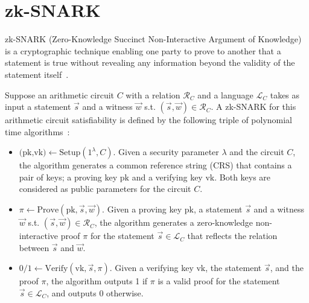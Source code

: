 \documentclass{article}
\begin{document}
\section{zk-SNARK}
zk-SNARK (Zero-Knowledge Succinct Non-Interactive Argument of Knowledge) is a cryptographic technique enabling one party to prove to another that a statement is true without revealing any information beyond the validity of the statement itself~\cite{grothSizePairingbasedNoninteractive2016}.

Suppose an arithmetic circuit $C$ with a relation $\mathcal{R}_C$ and a language $\mathcal{L}_C$ takes as input a statement $\vec{s}$ and a witness $\vec{w}$ s.t. $(\vec{s}, \vec{w}) \in \mathcal{R}_C$. A zk-SNARK for this arithmetic circuit satisfiability is defined by the following triple of polynomial time algorithms~\cite{grothSizePairingbasedNoninteractive2016,parnoPinocchioNearlyPractical2013}:
\begin{itemize}
    \item $\textrm{(pk,vk)} \gets \textrm{Setup}(1^\lambda,C)$. Given a security parameter $\lambda$ and the circuit $C$, the algorithm generates a common reference string (CRS) that contains a pair of keys; a proving key $\textrm{pk}$ and a verifying key $\textrm{vk}$. Both keys are considered as public parameters for the circuit $C$.
    \item $\pi \gets \textrm{Prove}(\textrm{pk}, \vec{s}, \vec{w})$. Given a proving key $\textrm{pk}$, a statement $\vec{s}$ and a witness $\vec{w}$ s.t. $(\vec{s}, \vec{w}) \in \mathcal{R}_C$, the algorithm generates a zero-knowledge non-interactive proof $\pi$ for the statement $\vec{s} \in \mathcal{L}_C$ that reflects the relation between $\vec{s}$ and $\vec{w}$.
    \item $0/1 \gets \textrm{Verify}(\textrm{vk}, \vec{s}, \pi)$. Given a verifying key $\textrm{vk}$, the statement $\vec{s}$, and the proof $\pi$, the algorithm outputs 1 if $\pi$ is  a valid proof for the statement $\vec{s} \in \mathcal{L}_C$, and outputs 0 otherwise.
\end{itemize}
\end{document}
